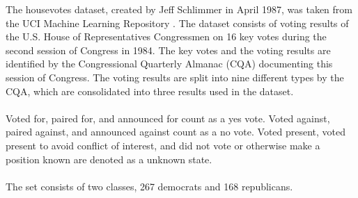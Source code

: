 \marginnote{\textcolor{cyan}{Niklas Conen}}
The housevotes dataset, created by Jeff Schlimmer in April 1987, was taken from the UCI Machine Learning Repository \cite{Dua2019}. The dataset consists of voting results of the U.S. House of Representatives Congressmen on 16 key votes during the second session of Congress in 1984. The key votes and the voting results are identified by the Congressional Quarterly Almanac (CQA) documenting this session of Congress. The voting results are split into nine different types by the CQA, which are consolidated into three results used in the dataset.\\
\ \\
Voted for, paired for, and announced for count as a yes vote.
Voted against, paired against, and announced against count as a no vote.
Voted present, voted present to avoid conflict of interest, and did not vote or otherwise make a position known are denoted as a unknown state.\\
\ \\
The set consists of two classes, 267 democrats and 168 republicans.

